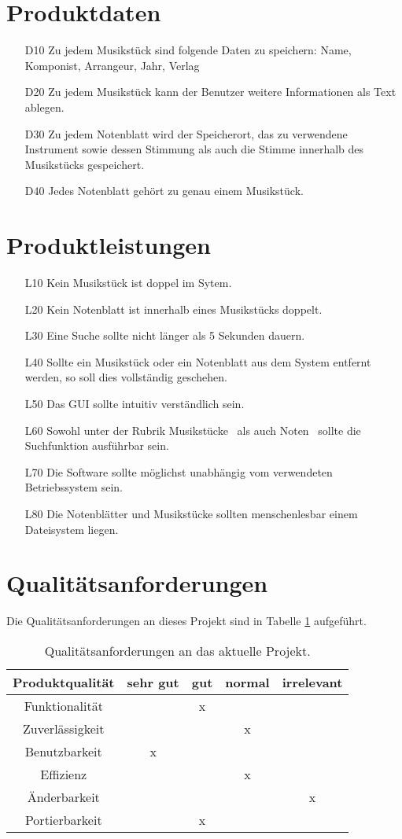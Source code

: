 \documentclass[10pt]{scrartcl}
\begin{document}
\section{Produktdaten}
\begin{enumerate}
	\item[D10] Zu jedem Musikstück sind folgende Daten zu speichern: Name, Komponist, Arrangeur, Jahr, Verlag
	\item[D20] Zu jedem Musikstück kann der Benutzer weitere Informationen als Text ablegen.
	\item[D30] Zu jedem Notenblatt wird der Speicherort, das zu verwendene Instrument sowie dessen Stimmung als auch die Stimme innerhalb des Musikstücks gespeichert.
	\item[D40] Jedes Notenblatt gehört zu genau einem Musikstück.
\end{enumerate}
\section{Produktleistungen}
\begin{enumerate}
\item[L10] Kein Musikstück ist doppel im Sytem.
\item[L20] Kein Notenblatt ist innerhalb eines Musikstücks doppelt.
\item[L30] Eine Suche sollte nicht länger als 5 Sekunden dauern.
\item[L40] Sollte ein Musikstück oder ein Notenblatt aus dem System entfernt werden, so soll dies vollständig geschehen.
\item[L50] Das GUI sollte intuitiv verständlich sein.
\item[L60] Sowohl unter der Rubrik \glqq Musikstücke\grqq~  als auch \glqq Noten\grqq~ sollte die Suchfunktion ausführbar sein.
\item[L70] Die Software sollte möglichst unabhängig vom verwendeten Betriebssystem sein.
\item[L80] Die Notenblätter und Musikstücke sollten menschenlesbar einem Dateisystem liegen.
\end{enumerate}
\section{Qualitätsanforderungen}
Die Qualitätsanforderungen an dieses Projekt sind in Tabelle \ref{Tab. Qualitaetsanforderungen} aufgeführt.
\begin{table}
\centering
\begin{tabular}{| c | c | c | c | c |}
\hline
Produktqualität &	sehr gut&	gut & normal& irrelevant \\
\hline
\hline
Funktionalität	&			&	x	&		&		\\
\hline
Zuverlässigkeit	&			&		&	x	&		\\
\hline
Benutzbarkeit	&	x		&		&		&		\\
\hline
Effizienz		&			&		&	x	&		\\
\hline
Änderbarkeit	&			&		&		&	x	\\
\hline
Portierbarkeit	&			&	x	&		&		\\
\hline
\end{tabular}
\caption{Qualitätsanforderungen an das aktuelle Projekt.}
\label{Tab. Qualitaetsanforderungen}
\end{table}
\end{document}
